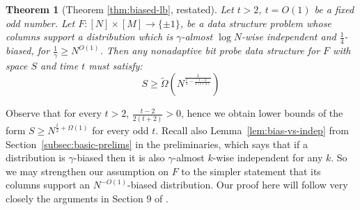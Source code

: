 \documentclass[11pt]{article}
\newtheorem*{theorem*}{Theorem}
\newcommand{\N}{[N]}
\begin{document}
\begin{theorem*} [Theorem \ref{thm:biased-lb}, restated]
Let $t>2$, $t = O(1)$ be a fixed odd number.  Let $F:\N \times [M] \to \{\pm 1\}$, be a data structure problem whose columns support a distribution which is $\gamma$-almost $\log N$-wise independent and $\frac{1}{4}$-biased, for $\frac{1}{\gamma} \geq N^{O(1)}$. Then any nonadaptive bit probe data structure for $F$ with space $S$ and time $t$ must satisfy:
\[
S \geq \tilde{\Omega}(N^{\frac{1}{\frac{t}{2} -\frac{t- 2}{2(t+2)}}})
\]
\end{theorem*}
Observe that for every $t>2$, $\frac{t-2}{2(t+2)} > 0$, hence we obtain lower bounds of the form $S \geq N^{\frac{t}{2} + \Omega(1)}$ for every odd $t$. Recall also Lemma~\ref{lem:bias-vs-indep} from Section~\ref{subsec:basic-prelims} in the preliminaries, which says that if a distribution is $\gamma$-biased then it is also $\gamma$-almost $k$-wise independent for any $k$. So we may strengthen our assumption on $F$ to the simpler statement that its columns support an $N^{-O(1)}$-biased distribution. Our proof here will follow very closely the arguments in Section 9 of \cite{smoothed}.
\end{document}
